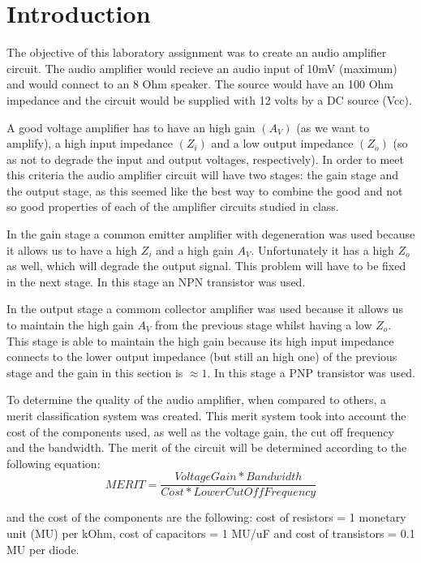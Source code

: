 \section{Introduction}
\label{sec:introduction}


\par The objective of this laboratory assignment was to create an audio amplifier circuit. The audio amplifier would recieve an audio input of 10mV (maximum) and would connect to an 8 Ohm speaker. The source would have an 100 Ohm impedance and the circuit would be supplied with 12 volts by a DC source (Vcc).
\par A good voltage amplifier has to have an high gain $(A_{V})$ (as we want to amplify), a high input impedance $(Z_{i})$ and a low output impedance $(Z_{o})$ (so as not to degrade the input and output voltages, respectively). In order to meet this criteria the audio amplifier circuit will have two stages: the gain stage and the output stage, as this seemed like the best way to combine the good and not so good properties of each of the amplifier circuits studied in class.\par
 In the gain stage a common emitter amplifier with degeneration was used because it allows us to have a high $Z_{i}$ and a high gain $A_{V}$. Unfortunately it has a high $Z_{o}$ as well, which will degrade the output signal. This problem will have to be fixed in the next stage. In this stage an NPN transistor was used.\par
 In the output stage a commom collector amplifier was used because it allows us to maintain  the high gain $A_{V}$ from the previous stage whilst having a low $Z_{o}$. This stage is able to maintain the high gain because its high input impedance connects to the lower output impedance (but still an high one) of the previous stage and the gain in this section is $\approx 1$. In this stage a PNP transistor was used.
\par   
To determine the quality of the audio amplifier, when compared to others, a merit classification system was created. This merit system took into account the cost of the components used, as well as the voltage gain, the cut off frequency and the bandwidth. The merit of the circuit will be determined according to the following equation: 
\begin {equation}
	 MERIT = \frac{Voltage Gain*Bandwidth}{Cost*Lower Cut Off Frequency}   	
	\label{eq:i1}
\end{equation}

and the cost of the components are the following: cost of resistors = 1 monetary unit (MU) per kOhm, cost of capacitors = 1 MU/uF
and cost of transistors = 0.1 MU per diode. 

